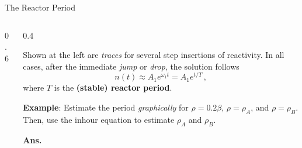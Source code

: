 \documentclass[aspectratio=1610]{beamer}
\begin{document}
\begin{frame}[fragile]{The Reactor Period}
 
\begin{columns}[T]

\begin{column}{0.6\textwidth}

\resizebox{0.99\textwidth}{!}{}

\end{column}

\begin{column}{0.4\textwidth}

Shown at the left are {\it traces} for several step insertions of reactivity.  
In all cases, after the immediate {\it jump} or {\it drop}, the solution follows
\begin{equation*}
   n(t) \approx A_1 e^{\omega_1 t} = A_1 e^{t/T} \, ,
\end{equation*}
where $T$ is the {\bf (stable) reactor period}.
 
\vspace{0.25cm}

{\bf Example}: Estimate the period {\it graphically} for $\rho = 0.2\beta$, $\rho = \rho_A$, and $\rho = \rho_B$.
Then, use the inhour equation to estimate $\rho_A$ and $\rho_B$.

\pause 

\textcolor{wcprimary}{
{\bf Ans.}
}

\end{column}

\end{columns}

\end{frame}
\end{document}
